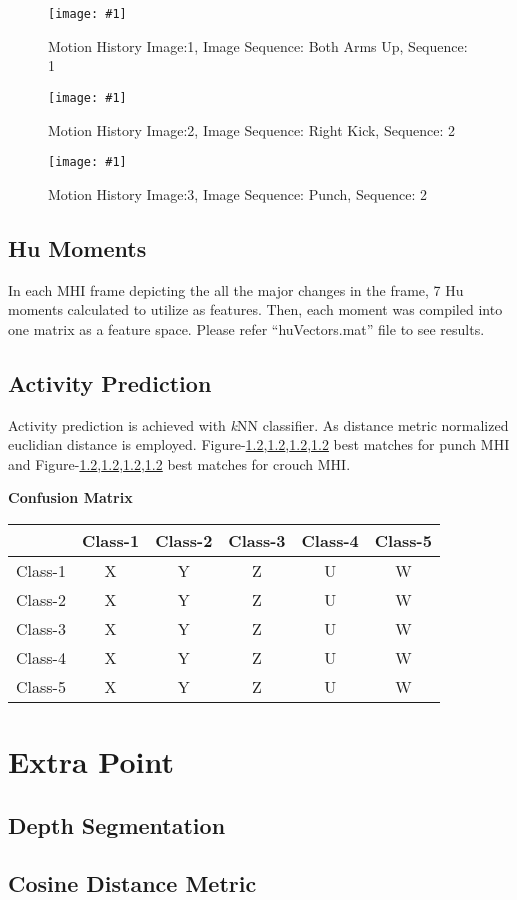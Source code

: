 \documentclass{article}
\newcommand{\listFigure}[3]{ \begin{figure}[H]
\texttt{[image: \#1]}
		\caption{#2\label{fig:#3}} 
	\end{figure}		
}
\begin{document}
\listFigure{MHI-botharms-p1-1.png}{Motion History Image:1, Image Sequence:
Both Arms Up, Sequence:
1}{MHI-botharms-p1-1} 

\listFigure{MHI-rightkick-p1-2.png}{Motion History Image:2, Image Sequence:
Right Kick, Sequence:
2}{MHI-rightkick-p1-2} 

\listFigure{MHI-punch-p1-2.png}{Motion History Image:3, Image Sequence:
Punch, Sequence:
2}{MHI-punch-p1-2.png} 
\subsection{Hu Moments}
In each MHI frame depicting the all the major changes in the frame, 7 Hu moments
calculated to utilize as features. Then, each moment was compiled into one
matrix as a feature space. Please refer ``huVectors.mat'' file to see results.
\subsection{Activity Prediction}
Activity prediction is achieved with \textit{k}NN classifier. As distance
metric normalized euclidian distance is employed.
Figure-\ref{},\ref{},\ref{},\ref{} best matches for punch MHI and
Figure-\ref{},\ref{},\ref{},\ref{} best matches for crouch MHI.

\textbf{Confusion Matrix}
\begin{center}
	\begin{tabular}{ |c | c | c | c | c | c| }
	\hline
	  & Class-1 & Class-2 & Class-3 & Class-4 & Class-5 \\ \hline
	  Class-1 & X & Y & Z & U & W \\ \hline
	  Class-2 & X & Y & Z & U & W \\ \hline
	  Class-3 & X & Y & Z & U & W \\ \hline
	  Class-4 & X & Y & Z & U & W \\ \hline
	  Class-5 & X & Y & Z & U & W \\
	\hline
	\end{tabular}
\end{center}


\section{Extra Point}
\subsection{Depth Segmentation}
\subsection{Cosine Distance Metric}
\end{document}
